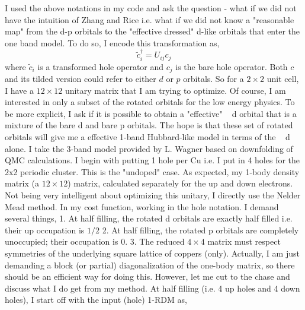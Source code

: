 \documentclass[prl,12pt,onecolumn,nofootinbib,notitlepage,english,superscriptaddress]{revtex4-1}
\begin{document}
I used the above notations in my code and ask the question
- what if we did not have the intuition of Zhang and Rice i.e.
what if we did not know a "reasonable map" from the d-p
orbitals to the "effective dressed" d-like orbitals that enter the
one band model.
To do so, I encode this transformation as,
\begin{equation}
	\tilde{c}_i^{\dagger} = U_{ij} c_j
\end{equation}
where $\tilde{c}_i$ is a transformed hole operator and $c_j$ is the bare hole
operator. Both $c$ and its tilded version could refer to either
$d$ or $p$ orbitals. So for a $2\times2$ unit cell, I have a $12\times12$
unitary matrix that I am trying to optimize. Of course, I am
interested in only a subset of the rotated orbitals for the low
energy physics. To be more explicit, I ask if it is possible to
obtain a "effective" ~ d orbital that is a mixture of the bare d and
bare p orbitals. The hope is that these set of rotated orbitals
will give me a effective 1-band Hubbard-like model in terms
of the ~ d alone.
I take the 3-band model provided by L. Wagner based on
downfolding of QMC calculations. I begin with putting 1 hole
per Cu i.e. I put in 4 holes for the 2x2 periodic cluster. This
is the "undoped" case. As expected, my 1-body density matrix
(a $12\times12$) matrix, calculated separately for the up and
down electrons. Not being very intelligent about optimizing
this unitary, I directly use the Nelder Mead method. In my
cost function, working in the hole notation. I demand several
things,
1. At half filling, the rotated d orbitals are exactly half filled
i.e. their up occupation is $1/2$
2. At half filling, the rotated p orbitals are completely unoccupied;
their occupation is 0.
3. The reduced $4\times4$ matrix must respect symmetries of the
underlying square lattice of coppers (only).
Actually, I am just demanding a block (or partial) diagonalization
of the one-body matrix, so there should be an efficient
way for doing this. However, let me cut to the chase and discuss
what I do get from my method.
At half filling (i.e. 4 up holes and 4 down holes), I start off
with the input (hole) 1-RDM as,
\end{document}
